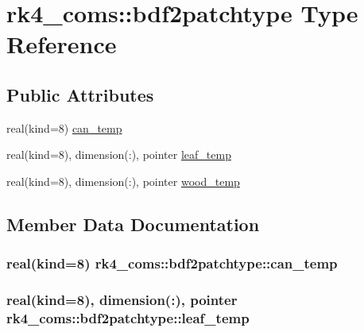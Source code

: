 \hypertarget{structrk4__coms_1_1bdf2patchtype}{}\section{rk4\+\_\+coms\+:\+:bdf2patchtype Type Reference}
\label{structrk4__coms_1_1bdf2patchtype}
\subsection*{Public Attributes}
\begin{DoxyCompactItemize}
\item 
real(kind=8) \hyperlink{structrk4__coms_1_1bdf2patchtype_aec0aed9409122068c64242b3110a943d}{can\+\_\+temp}
\item 
real(kind=8), dimension(\+:), pointer \hyperlink{structrk4__coms_1_1bdf2patchtype_a3bfd89d8aeb7e32b951eb9a8cb16f61e}{leaf\+\_\+temp}
\item 
real(kind=8), dimension(\+:), pointer \hyperlink{structrk4__coms_1_1bdf2patchtype_a760e813763073c0ebbcc9768d2d85b92}{wood\+\_\+temp}
\end{DoxyCompactItemize}


\subsection{Member Data Documentation}
\hypertarget{structrk4__coms_1_1bdf2patchtype_aec0aed9409122068c64242b3110a943d}{}
\subsubsection[{can\+\_\+temp}]{\setlength{\rightskip}{0pt plus 5cm}real(kind=8) rk4\+\_\+coms\+::bdf2patchtype\+::can\+\_\+temp}\label{structrk4__coms_1_1bdf2patchtype_aec0aed9409122068c64242b3110a943d}
\hypertarget{structrk4__coms_1_1bdf2patchtype_a3bfd89d8aeb7e32b951eb9a8cb16f61e}{}
\subsubsection[{leaf\+\_\+temp}]{\setlength{\rightskip}{0pt plus 5cm}real(kind=8), dimension(\+:), pointer rk4\+\_\+coms\+::bdf2patchtype\+::leaf\+\_\+temp}\label{structrk4__coms_1_1bdf2patchtype_a3bfd89d8aeb7e32b951eb9a8cb16f61e}
\hypertarget{structrk4__coms_1_1bdf2patchtype_a760e813763073c0ebbcc9768d2d85b92}{}
